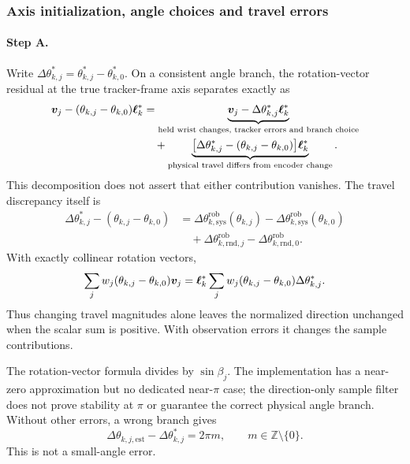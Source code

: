 \documentclass[../main.tex]{subfiles}
\begin{document}
\subsubsection{Axis initialization, angle choices and travel errors}
\paragraph{Step A.}
Write $\Delta\theta_{k,j}^*=\theta_{k,j}^*-\theta_{k,0}^*$. On a consistent angle branch, the rotation-vector residual at the true tracker-frame axis separates exactly as
\begin{equation*}
\begin{aligned}
\bm{v}_j-(\theta_{k,j}-\theta_{k,0})\bm{\ell}_k^*
&=\underbrace{\bm{v}_j-\Delta\theta_{k,j}^*\bm{\ell}_k^*}_{\text{held wrist changes, tracker errors and branch choice}}\\
&\quad+\underbrace{\bigl[\Delta\theta_{k,j}^*-(\theta_{k,j}-\theta_{k,0})\bigr]\bm{\ell}_k^*}_{\text{physical travel differs from encoder change}}.
\end{aligned}
\end{equation*}
This decomposition does not assert that either contribution vanishes. The travel discrepancy itself is
\begin{equation*}
\begin{aligned}
\Delta\theta_{k,j}^*-(\theta_{k,j}-\theta_{k,0})
&=\Delta\theta^{\mathrm{rob}}_{k,\mathrm{sys}}(\theta_{k,j})
-\Delta\theta^{\mathrm{rob}}_{k,\mathrm{sys}}(\theta_{k,0})\\
&\quad+\Delta\theta^{\mathrm{rob}}_{k,\mathrm{rnd},j}
-\Delta\theta^{\mathrm{rob}}_{k,\mathrm{rnd},0}.
\end{aligned}
\end{equation*}
With exactly collinear rotation vectors,
\begin{equation*}
\sum_jw_j(\theta_{k,j}-\theta_{k,0})\bm{v}_j
=\bm{\ell}_k^*\sum_jw_j(\theta_{k,j}-\theta_{k,0})\Delta\theta_{k,j}^*.
\end{equation*}
Thus changing travel magnitudes alone leaves the normalized direction unchanged when the scalar sum is positive. With observation errors it changes the sample contributions.

The rotation-vector formula divides by $\sin\beta_j$. The implementation has a near-zero approximation but no dedicated near-$\pi$ case; the direction-only sample filter does not prove stability at $\pi$ or guarantee the correct physical angle branch. Without other errors, a wrong branch gives
\begin{equation*}
\Delta\theta_{k,j,\mathrm{est}}-\Delta\theta_{k,j}^*=2\pi m,\qquad
m\in\mathbb Z\setminus\{0\}.
\end{equation*}
This is not a small-angle error.
\end{document}
